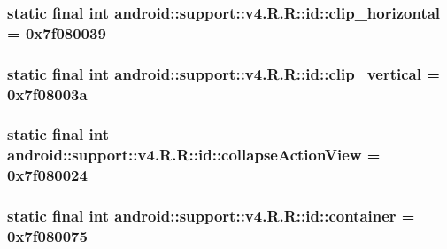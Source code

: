 \hypertarget{classandroid_1_1support_1_1v4_1_1_r_1_1id_62cc6e2a0b5e22f46bab64a3a16433b5}{
\subsubsection[{clip\_\-horizontal}]{\setlength{\rightskip}{0pt plus 5cm}static final int android::support::v4.R.R::id::clip\_\-horizontal = 0x7f080039}}
\label{classandroid_1_1support_1_1v4_1_1_r_1_1id_62cc6e2a0b5e22f46bab64a3a16433b5}


\hypertarget{classandroid_1_1support_1_1v4_1_1_r_1_1id_a19715dd1870db9bfbc0138828de4fa1}{
\subsubsection[{clip\_\-vertical}]{\setlength{\rightskip}{0pt plus 5cm}static final int android::support::v4.R.R::id::clip\_\-vertical = 0x7f08003a}}
\label{classandroid_1_1support_1_1v4_1_1_r_1_1id_a19715dd1870db9bfbc0138828de4fa1}


\hypertarget{classandroid_1_1support_1_1v4_1_1_r_1_1id_cb38e3be591c390a39ffdc2ce23d52b2}{
\subsubsection[{collapseActionView}]{\setlength{\rightskip}{0pt plus 5cm}static final int android::support::v4.R.R::id::collapseActionView = 0x7f080024}}
\label{classandroid_1_1support_1_1v4_1_1_r_1_1id_cb38e3be591c390a39ffdc2ce23d52b2}


\hypertarget{classandroid_1_1support_1_1v4_1_1_r_1_1id_0b4b52ebbbb524debb8250981237ab72}{
\subsubsection[{container}]{\setlength{\rightskip}{0pt plus 5cm}static final int android::support::v4.R.R::id::container = 0x7f080075}}
\label{classandroid_1_1support_1_1v4_1_1_r_1_1id_0b4b52ebbbb524debb8250981237ab72}


